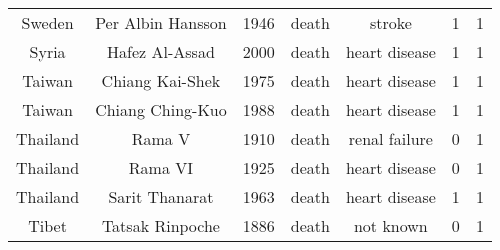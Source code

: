 \begin{center}
\begin{longtable}{ccccccc}
Sweden                                                                     & Per Albin Hansson                                                                     & 1946       & death         & stroke                                                                 & 1        & 1       \\
Syria                                                                      & Hafez Al-Assad                                                                        & 2000       & death         & heart disease                                                          & 1        & 1       \\
Taiwan                                                                     & Chiang Kai-Shek                                                                       & 1975       & death         & heart disease                                                          & 1        & 1       \\
Taiwan                                                                     & Chiang Ching-Kuo                                                                      & 1988       & death         & heart disease                                                          & 1        & 1       \\
Thailand                                                                   & Rama V                                                                                & 1910       & death         & renal failure                                                          & 0        & 1       \\
Thailand                                                                   & Rama VI                                                                               & 1925       & death         & heart disease                                                          & 0        & 1       \\
Thailand                                                                   & Sarit Thanarat                                                                        & 1963       & death         & heart disease                                                          & 1        & 1       \\
Tibet                                                                      & Tatsak Rinpoche                                                                       & 1886       & death         & not known                                                              & 0        & 1       \\

\end{longtable}
\end{center}
